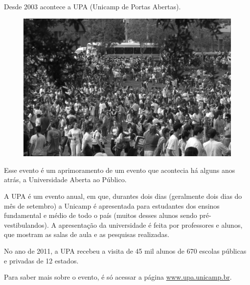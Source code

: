 Desde 2003 acontece a UPA (Unicamp de Portas Abertas).
\begin{figure}[h!]
    \centering
    \includegraphics[scale=0.38, keepaspectratio=true]{img/imgs/bateria.jpg}
\end{figure}
Esse evento é um
aprimoramento de um evento que acontecia há alguns anos atrás, a Universidade
Aberta ao Público.

A UPA é um evento anual, em que, durantes dois dias (geralmente dois dias do mês
de setembro) a Unicamp é apresentada para estudantes dos ensinos fundamental
e médio de todo o país (muitos desses alunos sendo pré-vestibulandos). A apresentação
da universidade é feita por professores e alunos, que mostram as salas de aula
e as pesquisas realizadas.

No ano de 2011, a UPA recebeu a visita de 45 mil alunos de 670 escolas públicas
e privadas de 12 estados.

Para saber mais sobre o evento, é só acessar a página
\url{www.upa.unicamp.br}.

